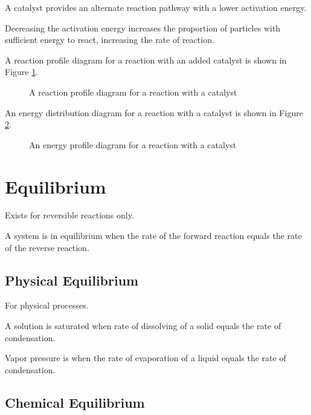 \documentclass[a4paper,11pt]{article}
\begin{document}
A catalyst provides an alternate reaction pathway with a lower activation
energy.

Decreasing the activation energy increases the proportion of particles with
sufficient energy to react, increasing the rate of reaction.

A reaction profile diagram for a reaction with an added catalyst is shown in
Figure \ref{fig:catalyst-reaction}.

\begin{figure}
\begin{center}
\caption{A reaction profile diagram for a reaction with a catalyst}
\label{fig:catalyst-reaction}
\end{center}
\end{figure}

An energy distribution diagram for a reaction with a catalyst is shown in
Figure \ref{fig:catalyst-distribution}.

\begin{figure}
\begin{center}
\caption{An energy profile diagram for a reaction with a catalyst}
\label{fig:catalyst-distribution}
\end{center}
\end{figure}




\section{Equilibrium}

Exists for reversible reactions only.

A system is in equilibrium when the rate of the forward reaction equals the
rate of the reverse reaction.


\subsection{Physical Equilibrium}

For physical processes.

A solution is saturated when rate of dissolving of a solid equals the rate of
condensation.

Vapor pressure is when the rate of evaporation of a liquid equals the rate of
condensation.


\subsection{Chemical Equilibrium}
\end{document}

